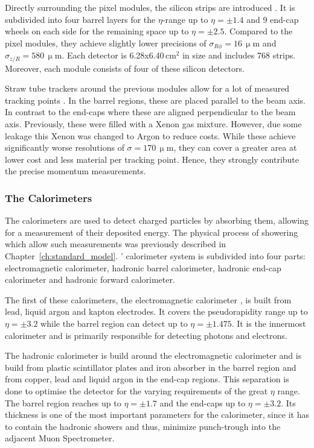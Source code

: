 \documentclass[bachelor,ngerman,english]{GAUBM}
\begin{document}
Directly surrounding the pixel modules, the silicon strips are introduced \cite{atlas:tech_design_report_01,atlas:strip_detector}. It is subdivided into four barrel layers for the $\eta$-range up to $\eta=\pm1.4$ and 9 end-cap wheels on each side for the remaining space up to $\eta=\pm2.5$. Compared to the pixel modules, they achieve slightly lower precisions of $\sigma_{R\phi}=16\,\upmu\text{m}$ and $\sigma_{z/R}=580\,\upmu\text{m}$. Each detector is 6.28x6.40\,cm$^2$ in size and includes 768 strips. Moreover, each module consists of four of these silicon detectors.

Straw tube trackers around the previous modules allow for a lot of measured tracking points \cite{atlas:tech_design_report_01,atlas:transition_detector}. In the barrel regions, these are placed parallel to the beam axis. In contrast to the end-caps where these are aligned perpendicular to the beam axis. Previously, these were filled with a Xenon gas mixture. However, due some leakage this Xenon was changed to Argon to reduce costs. While these achieve significantly worse resolutions of $\sigma=170\,\upmu\text{m}$, they can cover a greater area at lower cost and less material per tracking point. Hence, they strongly contribute the precise momentum measurements.

\subsubsection*{The Calorimeters}
The calorimeters \cite{atlas:tech_design_report_01,atlas:calorimeter} are used to detect charged particles by absorbing them, allowing for a measurement of their deposited energy. The physical process of showering which allow such measurements was previously described in Chapter~\ref{ch:standard_model}. \atlas' calorimeter system is subdivided into four parts: electromagnetic calorimeter, hadronic barrel calorimeter, hadronic end-cap calorimeter and hadronic forward calorimeter.

The first of these calorimeters, the electromagnetic calorimeter \cite{atlas:tech_design_report_01}, is built from lead, liquid argon and kapton electrodes. It covers the pseudorapidity range up to $\eta=\pm3.2$ while the barrel region can detect up to $\eta=\pm1.475$. It is the innermost calorimeter and is primarily responsible for detecting photons and electrons. 

The hadronic calorimeter \cite{atlas:tech_design_report_01} is build around the electromagnetic calorimeter and is build from plastic scintillator plates and iron absorber in the barrel region and from copper, lead and liquid argon in the end-cap regions. This separation is done to optimise the detector for the varying requirements of the great $\eta$ range. The barrel region reaches up to $\eta=\pm1.7$ and the end-caps up to $\eta=\pm3.2$. Its thickness is one of the most important parameters for the calorimeter, since it has to contain the hadronic showers and thus, minimize punch-trough into the adjacent Muon Spectrometer.
\end{document}
